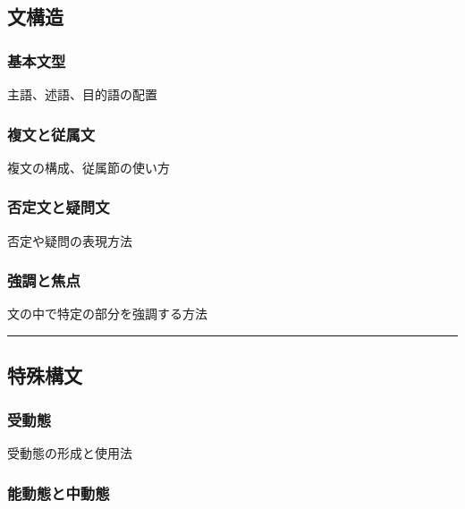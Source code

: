 \documentclass[
  japanese,
]{article}
\providecommand{\tightlist}{%
  \setlength{\itemsep}{0pt}\setlength{\parskip}{0pt}}
\begin{document}
\subsection{文構造}\label{chapter6}

\subsubsection{基本文型}\label{section6.1}

主語、述語、目的語の配置

\subsubsection{複文と従属文}\label{section6.2}

複文の構成、従属節の使い方

\subsubsection{否定文と疑問文}\label{section6.3}

否定や疑問の表現方法

\subsubsection{強調と焦点}\label{section6.4}

文の中で特定の部分を強調する方法

\begin{center}\rule{0.5\linewidth}{0.5pt}\end{center}

\subsection{特殊構文}\label{chapter7}

\subsubsection{受動態}\label{section7.1}

受動態の形成と使用法

\begin{description}
\tightlist
\item[]
\end{description}

\subsubsection{能動態と中動態}\label{section7.2}
\end{document}
